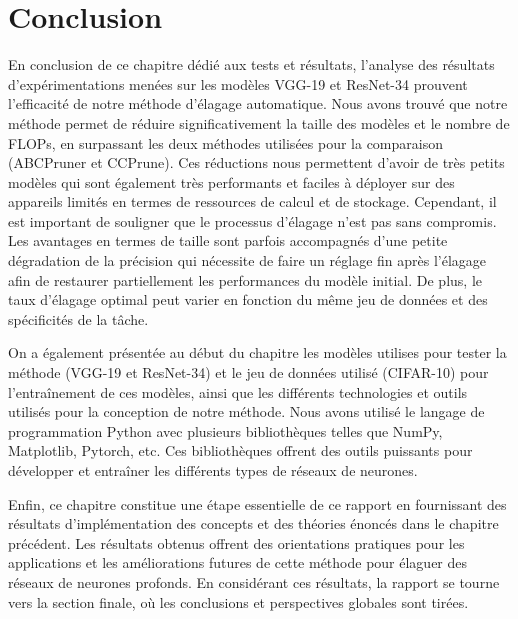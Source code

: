 \section{Conclusion}
En conclusion de ce chapitre dédié aux tests et résultats, l'analyse des résultats d'expérimentations menées sur les modèles VGG-19 et ResNet-34 prouvent l'efficacité de notre méthode d'élagage automatique. Nous avons trouvé que notre méthode permet de réduire significativement la taille des modèles et le nombre de FLOPs, en surpassant les deux méthodes utilisées pour la comparaison (ABCPruner et CCPrune). Ces réductions nous permettent d'avoir de très petits modèles qui sont également très performants et faciles à déployer sur des appareils limités en termes de ressources de calcul et de stockage. Cependant, il est important de souligner que le processus d'élagage n'est pas sans compromis. Les avantages en termes de taille sont parfois accompagnés d'une petite dégradation de la précision qui nécessite de faire un réglage fin après l'élagage afin de restaurer partiellement les performances du modèle initial. De plus, le taux d'élagage optimal peut varier en fonction du même jeu de données et des spécificités de la tâche.

On a également présentée au début du chapitre les modèles utilises pour tester la méthode (VGG-19 et ResNet-34) et le jeu de données utilisé (CIFAR-10) pour l'entraînement de ces modèles, ainsi que les différents technologies et outils utilisés pour la conception de notre méthode. Nous avons utilisé le langage de programmation Python avec plusieurs bibliothèques telles que NumPy, Matplotlib, Pytorch, etc. Ces bibliothèques offrent des outils puissants pour développer et entraîner les différents types de réseaux de neurones.

Enfin, ce chapitre constitue une étape essentielle de ce rapport en fournissant des résultats d'implémentation des concepts et des théories énoncés dans le chapitre précédent. Les résultats obtenus offrent des orientations pratiques pour les applications et les améliorations futures de cette méthode pour élaguer des réseaux de neurones profonds. En considérant ces résultats, la rapport se tourne vers la section finale, où les conclusions et perspectives globales sont tirées.
